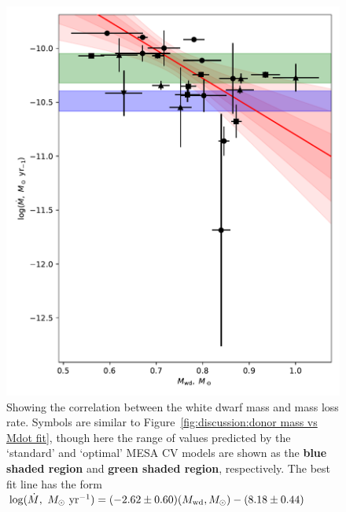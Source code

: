 \begin{figure}
    \centering
    \includegraphics[width=\textwidth]{figures/results/Mdot/Mwd_Mdot.pdf}
    \caption{Showing the correlation between the white dwarf mass and mass loss rate. Symbols are similar to Figure~\ref{fig:discussion:donor mass vs Mdot fit}, though here the range of values predicted by the `standard' and `optimal' MESA CV models are shown as the {\bf blue shaded region} and {\bf green shaded region}, respectively. The best fit line has the form $\log ( \dot M,\ M_\odot\ {\rm yr}^{-1}) = (-2.62 \pm 0.60) (M_{\rm wd}, M_\odot) - (8.18 \pm 0.44)$}
    \label{fig:discussion:white dwarf mass vs Mdot fit}
\end{figure}


